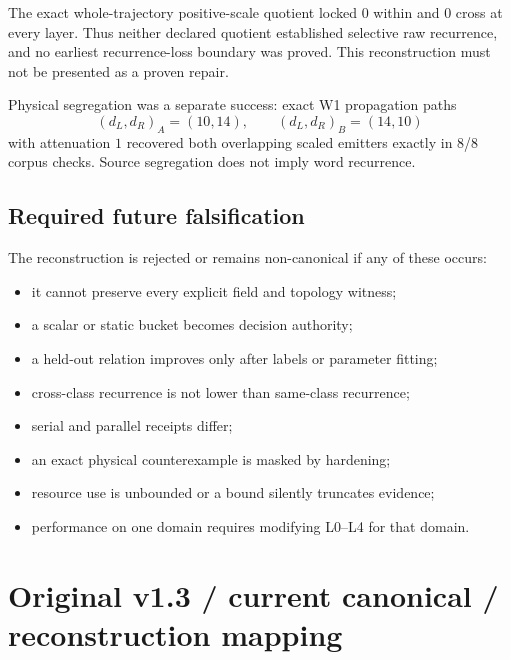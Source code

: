 \documentclass[11pt,oneside]{article}
\begin{document}
The exact whole-trajectory positive-scale quotient locked 0 within and 0 cross
at every layer. Thus neither declared quotient established selective raw
recurrence, and no earliest recurrence-loss boundary was proved. This
reconstruction must not be presented as a proven repair.

Physical segregation was a separate success: exact W1 propagation paths
\[
  (d_L,d_R)_A=(10,14),\qquad
  (d_L,d_R)_B=(14,10)
\]
with attenuation \(1\) recovered both overlapping scaled emitters exactly in
8/8 corpus checks. Source segregation does not imply word recurrence.

\subsection{Required future falsification}

The reconstruction is rejected or remains non-canonical if any of these
occurs:
\begin{itemize}
  \item it cannot preserve every explicit field and topology witness;
  \item a scalar or static bucket becomes decision authority;
  \item a held-out relation improves only after labels or parameter fitting;
  \item cross-class recurrence is not lower than same-class recurrence;
  \item serial and parallel receipts differ;
  \item an exact physical counterexample is masked by hardening;
  \item resource use is unbounded or a bound silently truncates evidence;
  \item performance on one domain requires modifying L0--L4 for that domain.
\end{itemize}

\section{Original v1.3 / current canonical / reconstruction mapping}
\end{document}

